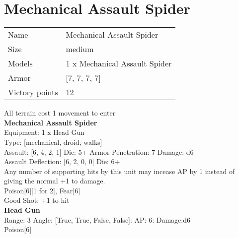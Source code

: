 \pagebreak

\section{ Mechanical Assault Spider }

\begin{tabular}{ll}
  Name & Mechanical Assault Spider \\
  Size & medium\\
  Models & 1 x Mechanical Assault Spider\\
  Armor & [7, 7, 7, 7]\\
  Victory points & 12\\
\end{tabular}

All terrain cost 1 movement to enter\\ 


{\bf Mechanical Assault Spider } \\
Equipment: 1 x Head Gun \\
Type: [mechanical, droid, walks] \\

Assault: [6, 4, 2, 1] Die: 5+ Armor Penetration: 7 Damage: d6 \\
Assault Deflection: [6, 2, 0, 0] Die: 6+\\
\indent Any number of supporting hits by this unit may incease AP by 1 instead of giving the normal +1 to damage.\\ 
Poison[6][1 for 2], Fear[6]\\ 
 

Good Shot: +1 to hit\\ 


{\bf Head Gun } \\



Range: 3  Angle: [True, True, False, False]: AP: 6: Damage:d6 \\
Poison[6]\\ 




 





